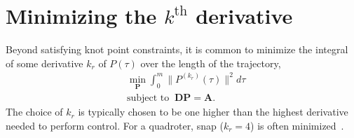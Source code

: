 %

\section{Minimizing the $k^\mathrm{th}$ derivative}
Beyond satisfying knot point constraints, it is common \cite{RichterBryRoy16,MellingerKumar11} 
to minimize the integral of some derivative $k_r$ of $P(\tau)$ over the length of the trajectory,
\begin{equation}
	\label{eq:min_derivative}
	\begin{aligned}
	&\min_{\mathbf{P}} \int_{0}^m \|P^{(k_r)}(\tau)\|^2 d\tau \\
	&\text{subject to } \: \mathbf{D}\mathbf{P} = \mathbf{A}. 
	\end{aligned}
\end{equation}
The choice of $k_r$ is typically chosen to be one higher than the highest derivative needed to perform control. 
For a quadroter, snap ($k_r = 4$) is often minimized~\cite{MellingerKumar11}.


